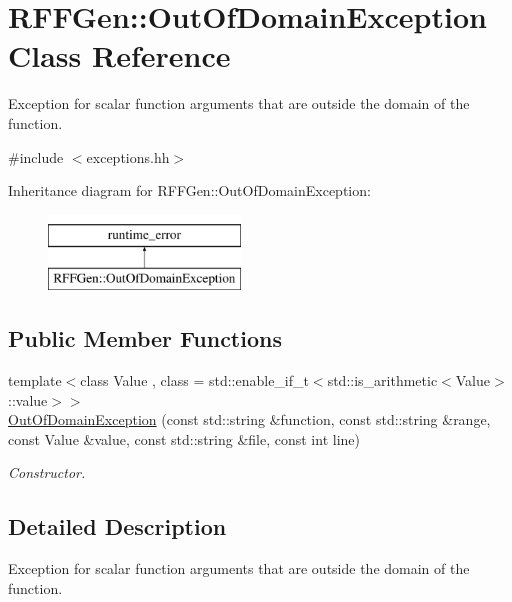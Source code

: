 \hypertarget{classRFFGen_1_1OutOfDomainException}{\section{R\-F\-F\-Gen\-:\-:Out\-Of\-Domain\-Exception Class Reference}
\label{classRFFGen_1_1OutOfDomainException}
}


Exception for scalar function arguments that are outside the domain of the function.  




{\ttfamily \#include $<$exceptions.\-hh$>$}

Inheritance diagram for R\-F\-F\-Gen\-:\-:Out\-Of\-Domain\-Exception\-:\begin{figure}[H]
\begin{center}
\leavevmode
\includegraphics[height=2.000000cm]{classRFFGen_1_1OutOfDomainException}
\end{center}
\end{figure}
\subsection*{Public Member Functions}
\begin{DoxyCompactItemize}
\item 
{\footnotesize template$<$class Value , class  = std\-::enable\-\_\-if\-\_\-t$<$std\-::is\-\_\-arithmetic$<$\-Value$>$\-::value$>$$>$ }\\\hyperlink{classRFFGen_1_1OutOfDomainException_a3152ef040f15248bf49b7f4734ad4734}{Out\-Of\-Domain\-Exception} (const std\-::string \&function, const std\-::string \&range, const Value \&value, const std\-::string \&file, const int line)
\begin{DoxyCompactList}\small\item\em Constructor. \end{DoxyCompactList}\end{DoxyCompactItemize}


\subsection{Detailed Description}
Exception for scalar function arguments that are outside the domain of the function. 

